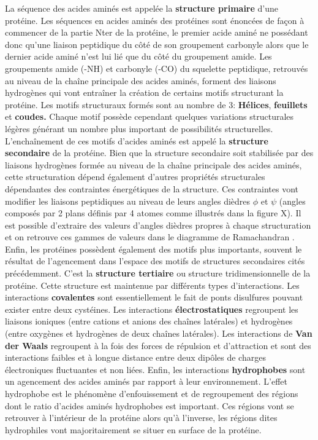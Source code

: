 La séquence des acides aminés est appelée la \textbf{structure primaire} d'une protéine. Les séquences en acides aminés des protéines sont énoncées de façon à commencer de la partie Nter de la protéine, le premier acide aminé ne possédant donc qu'une liaison peptidique du côté de son groupement carbonyle alors que le dernier acide aminé n'est lui lié que du côté du groupement amide.
Les groupements amide (-NH) et carbonyle (-CO) du squelette peptidique, retrouvés au niveau de la chaîne principale des acides aminés, forment des liaisons hydrogènes qui vont entraîner la création de certains motifs structurant la protéine. Les motifs structuraux formés sont au nombre de 3: \textbf{Hélices}, \textbf{feuillets} et \textbf{coudes.} Chaque motif possède cependant quelques variations structurales légères générant un nombre plus important de possibilités structurelles. L’enchaînement de ces motifs d'acides aminés est appelé la \textbf{structure secondaire} de la protéine. Bien que la structure secondaire soit stabilisée par des liaisons hydrogènes formée au niveau de la chaîne principale des acides aminés, cette structuration dépend également d'autres propriétés structurales dépendantes des contraintes énergétiques de la structure. Ces contraintes vont modifier les liaisons peptidiques au niveau de leurs angles dièdres $\phi$ et $\psi$ (angles composés par 2 plans définis par 4 atomes comme illustrés dans la figure X). Il est possible d'extraire des valeurs d'angles dièdres propres à chaque structuration et on retrouve ces gammes de valeurs dans le diagramme de Ramachandran \cite{ramachandran1968conformation}.
Enfin, les protéines possèdent également des motifs plus importants, souvent le résultat de l'agencement dans l'espace des motifs de structures secondaires cités précédemment. C'est la \textbf{structure tertiaire} ou structure tridimensionnelle de la protéine. Cette structure est maintenue par différents types d'interactions. Les interactions \textbf{covalentes} sont essentiellement le fait de ponts disulfures pouvant exister entre deux cystéines. Les interactions \textbf{électrostatiques} regroupent les liaisons ioniques (entre cations et anions des chaînes latérales) et hydrogènes (entre oxygènes et hydrogènes de deux chaînes latérales). Les interactions de \textbf{Van der Waals} regroupent à la fois des forces de répulsion et d'attraction et sont des interactions faibles et à longue distance entre deux dipôles de charges électroniques fluctuantes et non liées. Enfin, les interactions \textbf{hydrophobes} sont un agencement des acides aminés par rapport à leur environnement. L'effet hydrophobe est le phénomène d'enfouissement et de regroupement des régions dont le ratio d'acides aminés hydrophobes est important. Ces régions vont se retrouver à l'intérieur de la protéine alors qu'à l'inverse, les régions dites hydrophiles vont majoritairement se situer en surface de la protéine.
